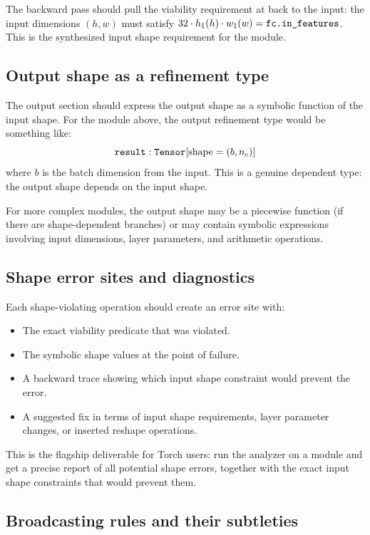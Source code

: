 \documentclass[11pt]{report}
\DeclareRobustCommand{\py}[1]{\texttt{\detokenize{#1}}}
\theoremstyle{definition}
\theoremstyle{plain}
\begin{document}
The backward pass should pull the viability requirement at \py{fc} back to the
input: the input dimensions $(h, w)$ must satisfy
$32 \cdot h_1(h) \cdot w_1(w) = \py{fc.in_features}$. This is the synthesized
input shape requirement for the module.

\subsection{Output shape as a refinement type}

The output section should express the output shape as a symbolic function of
the input shape. For the module above, the output refinement type would be
something like:
$$\py{result} : \py{Tensor}[\text{shape} = (b, n_c)]$$
where $b$ is the batch dimension from the input. This is a genuine dependent
type: the output shape depends on the input shape.

For more complex modules, the output shape may be a piecewise function (if
there are shape-dependent branches) or may contain symbolic expressions
involving input dimensions, layer parameters, and arithmetic operations.

\subsection{Shape error sites and diagnostics}

Each shape-violating operation should create an error site with:
\begin{itemize}[nosep]
  \item The exact viability predicate that was violated.
  \item The symbolic shape values at the point of failure.
  \item A backward trace showing which input shape constraint would prevent
        the error.
  \item A suggested fix in terms of input shape requirements, layer parameter
        changes, or inserted reshape operations.
\end{itemize}

This is the flagship deliverable for Torch users: run the analyzer on a module
and get a precise report of all potential shape errors, together with the
exact input shape constraints that would prevent them.

\subsection{Broadcasting rules and their subtleties}
\end{document}
